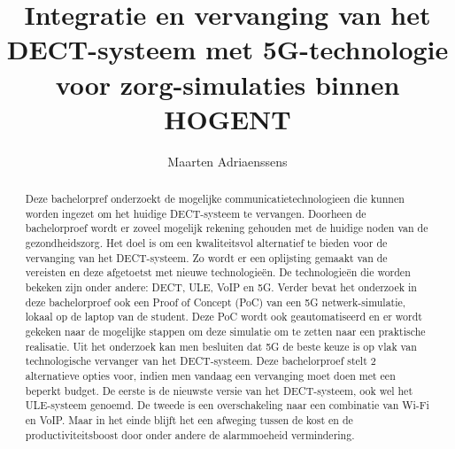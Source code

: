 \documentclass[a0,portrait]{hogent-poster}
\title{Integratie en vervanging van het DECT-\-systeem met 5G-\-technologie voor zorg-\-simulaties binnen HOGENT}
\author{Maarten Adriaenssens}
\begin{document}
\maketitle

\begin{abstract}



Deze bachelorpref onderzoekt de mogelijke communicatietechnologieen die kunnen worden ingezet om het huidige DECT-systeem te vervangen. Doorheen de bachelorproef wordt er zoveel mogelijk rekening gehouden met de huidige noden van de gezondheidszorg. Het doel is om een kwaliteitsvol alternatief te bieden voor de vervanging van het DECT-systeem. Zo wordt er een oplijsting gemaakt van de vereisten en deze afgetoetst met nieuwe technologieën. De technologieën die worden bekeken zijn onder andere: DECT, ULE, VoIP en 5G.
Verder bevat het onderzoek in deze bachelorproef ook een Proof of Concept (PoC) van een 5G netwerk-simulatie, lokaal op de laptop van de student. Deze PoC wordt ook geautomatiseerd en er wordt gekeken naar de mogelijke stappen om deze simulatie om te zetten naar een praktische realisatie.
Uit het onderzoek kan men besluiten dat 5G de beste keuze is op vlak van technologische vervanger van het DECT-systeem. Deze bachelorproef stelt 2 alternatieve opties voor, indien men vandaag een vervanging moet doen met een beperkt budget. De eerste is de nieuwste versie van het DECT-systeem, ook wel het ULE-systeem genoemd. De tweede is een overschakeling naar een combinatie van Wi-Fi en VoIP. Maar in het einde blijft het een afweging tussen de kost en de productiviteitsboost door onder andere de alarmmoeheid vermindering.


\end{abstract}
\end{document}

